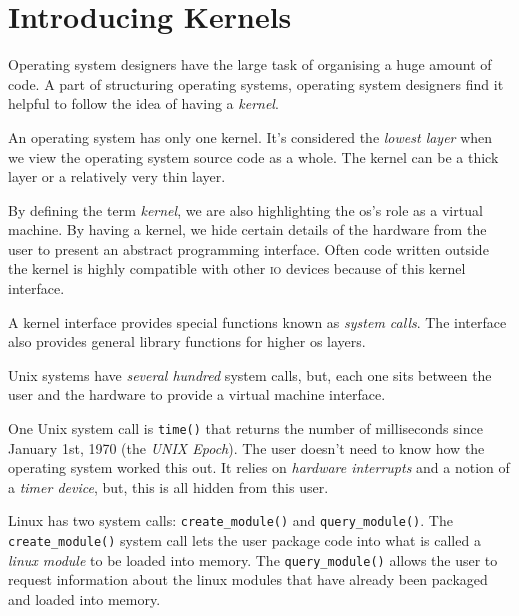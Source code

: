 \section{Introducing Kernels}

Operating system designers have the large task of 
organising a huge amount of code. 
A part of structuring operating systems,
operating system designers find it helpful to follow the idea of having a \textit{kernel}.


An operating system has only one kernel.
It's considered the \textit{lowest layer} 
when we view the operating system source code as a whole. 
The kernel can be a thick layer or a relatively very thin layer. 






By defining the term \textit{kernel}, we are also highlighting
the os's role as a virtual machine. 
By having a kernel, we hide certain details of the hardware from the user to present an 
abstract programming interface. Often code written outside the kernel is 
highly compatible with other \textsc{io} devices because of this kernel interface. 

A kernel interface provides special functions known as \textit{system calls}.
The interface also provides general library functions for higher os layers. 








Unix systems have \textit{several hundred} system calls, but, each one 
sits between the user and the hardware to provide a virtual machine interface.  

\begin{example}
One Unix system call is \lstinline{time()} that returns the number of milliseconds 
since January 1st, 1970 (the \textit{\textsc{UNIX} Epoch}). The user doesn't need to know 
how the operating system worked this out. It relies on \textit{hardware interrupts}
and a notion of a \textit{timer device}, but, this is all hidden from this user. 
\end{example}

\begin{example}
Linux has two system calls: \lstinline{create_module()} and \lstinline{query_module()}.
The \lstinline{create_module()} system call lets the user package code into
what is called a \textit{linux module} to be loaded into memory.
The \lstinline{query_module()} allows the user to request information about 
the linux modules that have already been packaged and loaded into memory.
\end{example}


